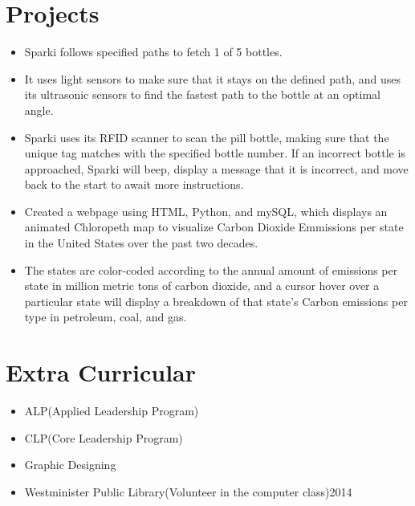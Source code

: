 \documentclass[10pt,a4paper,sans]{moderncv} %
\begin{document}
\section {Projects}
\begin{itemize}
\item{Sparki follows specified paths to fetch 1 of 5 bottles.} 
\item{It uses light sensors to make sure that it stays on the defined path, and uses its ultrasonic sensors to find the fastest path to the bottle at an optimal angle.} 
\item{Sparki uses its RFID scanner to scan the pill bottle, making sure that the unique tag  matches with the specified bottle number. If an incorrect bottle is approached, Sparki will beep, display a message that it is incorrect, and move back to the start to await more instructions.}
\end{itemize}

\hfill \break
{}
\begin{itemize}
\item{ Created a webpage using HTML, Python, and mySQL, which displays an animated Chloropeth map to visualize Carbon Dioxide Emmissions per state in the United States over the past two decades.}
\item{The states are color-coded according to the annual amount of emissions per state in million metric tons of carbon dioxide, and a cursor hover over a particular state will display a breakdown of that state's Carbon emissions per type in petroleum, coal, and gas.}
\end{itemize}

\section{Extra Curricular}
\begin{itemize}
\item{}{ALP(Applied Leadership Program)}
\item{}{CLP(Core Leadership Program)}
\item{}{Graphic Designing}
\item{}{Westminister Public Library(Volunteer in the computer class){2014}}
\end{itemize}
\end{document}
